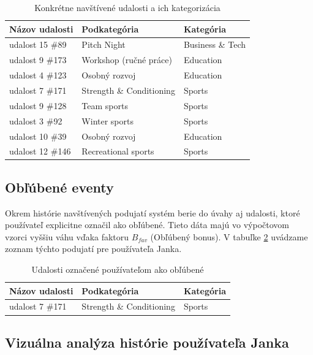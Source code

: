 \documentclass[12pt,a4paper]{article}
\begin{document}
\begin{table}[H]
\centering
\caption{Konkrétne navštívené udalosti a ich kategorizácia}
\label{tab:konkretne_eventy}
\small %
\begin{tabular}{|l|l|l|}
\hline
\textbf{Názov udalosti} & \textbf{Podkategória} & \textbf{Kategória} \\ \hline
udalost 15 \#89  & Pitch Night              & Business \& Tech \\
udalost 9 \#173  & Workshop (ručné práce)   & Education \\
udalost 4 \#123  & Osobný rozvoj            & Education \\
udalost 7 \#171  & Strength \& Conditioning & Sports \\
udalost 9 \#128  & Team sports              & Sports \\
udalost 3 \#92   & Winter sports            & Sports \\
udalost 10 \#39  & Osobný rozvoj            & Education \\
udalost 12 \#146 & Recreational sports      & Sports \\ \hline
\end{tabular}
\end{table}

\subsection{Obľúbené eventy}

Okrem histórie navštívených podujatí systém berie do úvahy aj udalosti, ktoré používateľ explicitne označil ako obľúbené. Tieto dáta majú vo výpočtovom vzorci vyššiu váhu vďaka faktoru $B_{fav}$ (Obľúbený bonus). V tabuľke \ref{tab:oblubene_udalosti} uvádzame zoznam týchto podujatí pre používateľa Janka.

\begin{table}[H]
\centering
\caption{Udalosti označené používateľom ako obľúbené}
\label{tab:oblubene_udalosti}
\begin{tabular}{|l|l|l|}
\hline
\textbf{Názov udalosti} & \textbf{Podkategória} & \textbf{Kategória} \\ \hline
udalost 7 \#171  & Strength \& Conditioning & Sports \\ \hline
\end{tabular}
\end{table}



\subsection{Vizuálna analýza histórie používateľa Janka}
\end{document}
